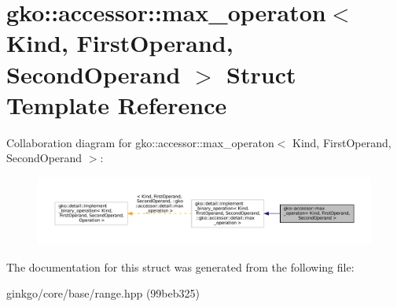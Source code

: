 \hypertarget{structgko_1_1accessor_1_1max__operaton}{}\section{gko\+:\+:accessor\+:\+:max\+\_\+operaton$<$ Kind, First\+Operand, Second\+Operand $>$ Struct Template Reference}
\label{structgko_1_1accessor_1_1max__operaton}


Collaboration diagram for gko\+:\+:accessor\+:\+:max\+\_\+operaton$<$ Kind, First\+Operand, Second\+Operand $>$\+:
\nopagebreak
\begin{figure}[H]
\begin{center}
\leavevmode
\includegraphics[width=350pt]{structgko_1_1accessor_1_1max__operaton__coll__graph}
\end{center}
\end{figure}


The documentation for this struct was generated from the following file\+:\begin{DoxyCompactItemize}
\item 
ginkgo/core/base/range.\+hpp (99beb325)\end{DoxyCompactItemize}
